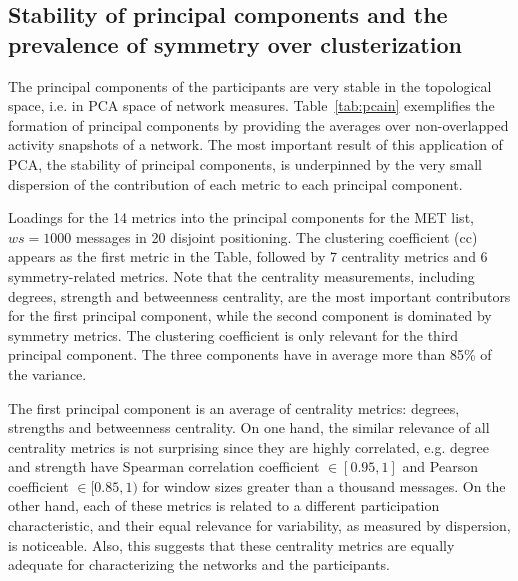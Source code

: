 \documentclass[%
aip,
jmp,%
amsmath,amssymb,
reprint,%
]{revtex4-1}
\begin{document}
\subsection{Stability of principal components and the prevalence of symmetry over clusterization}\label{prevalence}

The principal components of the participants are very stable in the topological space, i.e. in PCA space of network measures.
Table~\ref{tab:pcain} exemplifies the formation of principal components by providing the averages over non-overlapped activity snapshots of a network. The most important result of this application of PCA, the stability of principal components, is underpinned by the very small dispersion of the contribution of each metric to each principal component.

\begin{table}[!h]
\caption{Loadings for the 14 metrics into the principal components for the MET list, $ws=1000$ messages in 20 disjoint positioning. The clustering coefficient (cc) appears as the first metric in the Table, followed by 7 centrality metrics and 6 symmetry-related metrics. Note that the centrality measurements, including degrees, strength and betweenness centrality, are the most important contributors for the first principal component, while the second component is dominated by symmetry metrics. The clustering coefficient is only relevant for the third principal component. The three components have in average more than 85\% of the variance.}
\footnotesize

\label{tab:pcain}
\end{table}

The first principal component is an average of centrality metrics:
degrees, strengths and betweenness centrality.
On one hand, the similar relevance of all centrality metrics is not surprising since they are highly correlated,
e.g. degree and strength have Spearman correlation coefficient $\in [0.95,1]$ 
and Pearson coefficient $\in [0.85,1)$ for window sizes greater than a thousand messages.
On the other hand, each of these metrics is related to a different participation characteristic,
and their equal relevance for variability,
as measured by dispersion, is noticeable.
Also, this suggests that these centrality metrics 
are equally adequate for characterizing the networks
and the participants.
\end{document}
